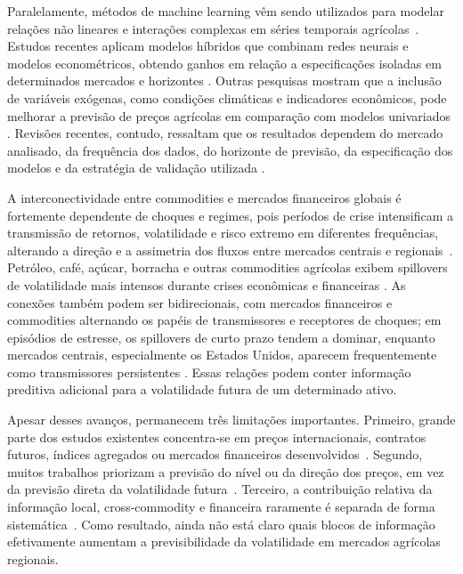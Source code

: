 \documentclass[a4paper,fleqn]{cas-sc}
\begin{document}
Paralelamente, métodos de machine learning vêm sendo utilizados para modelar relações não lineares e interações complexas em séries temporais agrícolas~\citep{105033941897,Zhang2025ClimateRealizedVolatility,Jin2024CoffeePriceML}. Estudos recentes aplicam modelos híbridos que combinam redes neurais e modelos econométricos, obtendo ganhos em relação a especificações isoladas em determinados mercados e horizontes \citep{Manogna2025HybridVolatility,S246822762500420X}. Outras pesquisas mostram que a inclusão de variáveis exógenas, como condições climáticas e indicadores econômicos, pode melhorar a previsão de preços agrícolas em comparação com modelos univariados \citep{Nayak2024ExogenousAgricultural,Zhang2025ClimateRealizedVolatility,Pandit2024CEEMDANTDNN}. Revisões recentes, contudo, ressaltam que os resultados dependem do mercado analisado, da frequência dos dados, do horizonte de previsão, da especificação dos modelos e da estratégia de validação utilizada \citep{Guindani2024AgriculturalForecasting}.

A interconectividade entre commodities e mercados financeiros globais é fortemente dependente de choques e regimes, pois períodos de crise intensificam a transmissão de retornos, volatilidade e risco extremo em diferentes frequências, alterando a direção e a assimetria dos fluxos entre mercados centrais e regionais~\citep{105008757196,84155181176,84901841234,85047926946}. Petróleo, café, açúcar, borracha e outras commodities agrícolas exibem spillovers de volatilidade mais intensos durante crises econômicas e financeiras \citep{Singh2026OilSoftCommoditySpillovers}. As conexões também podem ser bidirecionais, com mercados financeiros e commodities alternando os papéis de transmissores e receptores de choques; em episódios de estresse, os spillovers de curto prazo tendem a dominar, enquanto mercados centrais, especialmente os Estados Unidos, aparecem frequentemente como transmissores persistentes \citep{Zhou2026CommodityConnectedness}. Essas relações podem conter informação preditiva adicional para a volatilidade futura de um determinado ativo.

Apesar desses avanços, permanecem três limitações importantes. Primeiro, grande parte dos estudos existentes concentra-se em preços internacionais, contratos futuros, índices agregados ou mercados financeiros desenvolvidos~\citep{Zhou2026CommodityConnectedness,Pandit2024CEEMDANTDNN,Brun2026GARCHCoffeeRisk}. Segundo, muitos trabalhos priorizam a previsão do nível ou da direção dos preços, em vez da previsão direta da volatilidade futura~\citep{Jin2024CoffeePriceML,Chaovanapoonphol2023CoffeeGARCHX,AliagaMiranda2026CoffeeShocks}. Terceiro, a contribuição relativa da informação local, cross-commodity e financeira raramente é separada de forma sistemática~\citep{manogna2025dynamicnexus}. Como resultado, ainda não está claro quais blocos de informação efetivamente aumentam a previsibilidade da volatilidade em mercados agrícolas regionais.
\end{document}
